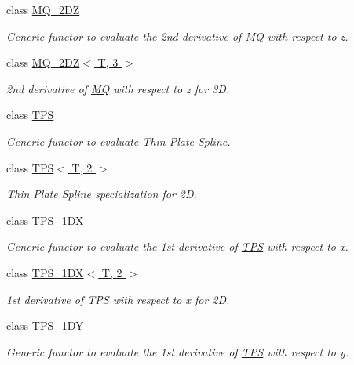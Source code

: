 \begin{CompactItemize}
class \hyperlink{classRBF_1_1MQ__2DZ}{MQ\_\-2DZ}
\begin{CompactList}\small\item\em Generic functor to evaluate the 2nd derivative of \hyperlink{classRBF_1_1MQ}{MQ} with respect to z. \item\end{CompactList}\item 
class \hyperlink{classRBF_1_1MQ__2DZ_3_01T_00_013_01_4}{MQ\_\-2DZ$<$ T, 3 $>$}
\begin{CompactList}\small\item\em 2nd derivative of \hyperlink{classRBF_1_1MQ}{MQ} with respect to z for 3D. \item\end{CompactList}\item 
class \hyperlink{classRBF_1_1TPS}{TPS}
\begin{CompactList}\small\item\em Generic functor to evaluate Thin Plate Spline. \item\end{CompactList}\item 
class \hyperlink{classRBF_1_1TPS_3_01T_00_012_01_4}{TPS$<$ T, 2 $>$}
\begin{CompactList}\small\item\em Thin Plate Spline specialization for 2D. \item\end{CompactList}\item 
class \hyperlink{classRBF_1_1TPS__1DX}{TPS\_\-1DX}
\begin{CompactList}\small\item\em Generic functor to evaluate the 1st derivative of \hyperlink{classRBF_1_1TPS}{TPS} with respect to x. \item\end{CompactList}\item 
class \hyperlink{classRBF_1_1TPS__1DX_3_01T_00_012_01_4}{TPS\_\-1DX$<$ T, 2 $>$}
\begin{CompactList}\small\item\em 1st derivative of \hyperlink{classRBF_1_1TPS}{TPS} with respect to x for 2D. \item\end{CompactList}\item 
class \hyperlink{classRBF_1_1TPS__1DY}{TPS\_\-1DY}
\begin{CompactList}\small\item\em Generic functor to evaluate the 1st derivative of \hyperlink{classRBF_1_1TPS}{TPS} with respect to y. \item\end{CompactList}\item 

\end{CompactItemize}
